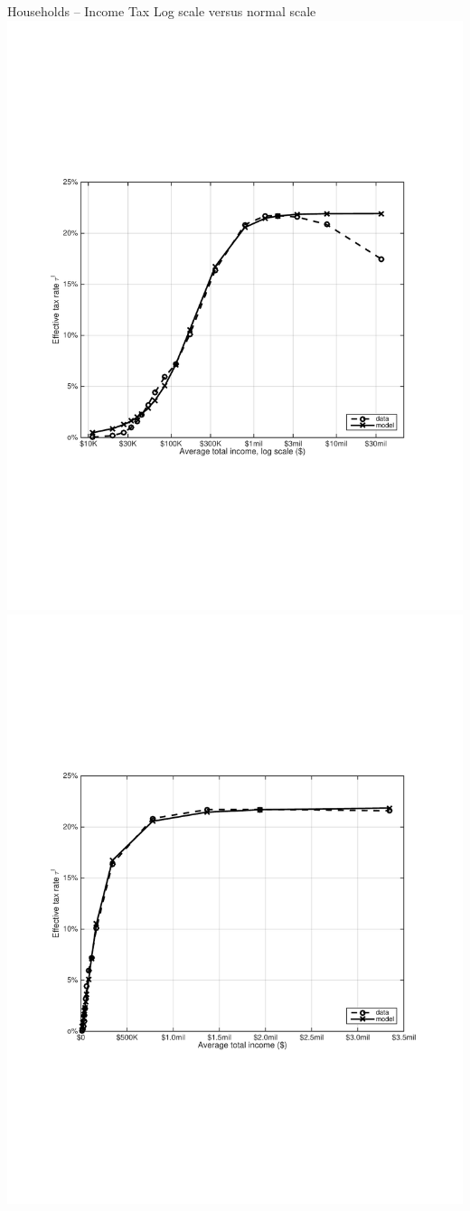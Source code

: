 \documentclass{beamer}
\begin{document}
  \begin{frame}{Households -- Income Tax}\label{Income Tax}
    Log scale versus normal scale
    \includegraphics[scale=.275]{images/EffTaxLog.pdf}
    \includegraphics[scale=.275]{images/EffTaxNoLog.pdf}

\end{frame}
\end{document}
